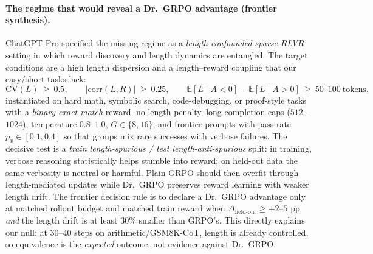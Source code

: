 \paragraph{The regime that would reveal a Dr.~GRPO advantage (frontier synthesis).}
ChatGPT Pro specified the missing regime as a \emph{length-confounded sparse-RLVR}
setting in which reward discovery and length dynamics are entangled. The target
conditions are a high length dispersion and a length--reward coupling that our
easy/short tasks lack:
\begin{equation}
\mathrm{CV}(L)\ \ge\ 0.5, \qquad
\bigl|\mathrm{corr}(L,R)\bigr|\ \ge\ 0.25, \qquad
\mathbb{E}[L \mid A<0] - \mathbb{E}[L \mid A>0]\ \ge\ 50\text{--}100\ \text{tokens},
\end{equation}
instantiated on hard math, symbolic search, code-debugging, or proof-style tasks
with a \emph{binary exact-match} reward, no length penalty, long completion caps
($512$--$1024$), temperature $0.8$--$1.0$, $G\in\{8,16\}$, and frontier prompts
with pass rate $p_x\in[0.1,0.4]$ so that groups mix rare successes with verbose
failures. The decisive test is a \emph{train length-spurious / test
length-anti-spurious} split: in training, verbose reasoning statistically helps
stumble into reward; on held-out data the same verbosity is neutral or harmful.
Plain GRPO should then overfit through length-mediated updates while Dr.~GRPO
preserves reward learning with weaker length drift. The frontier decision rule
is to declare a Dr.~GRPO advantage only at matched rollout budget and matched
train reward when $\Delta_{\text{held-out}}\ge +2$--$5$ pp \emph{and} the length
drift is at least $30\%$ smaller than GRPO's. This directly explains our null:
at $30$--$40$ steps on arithmetic/GSM8K-CoT, length is already controlled, so
equivalence is the \emph{expected} outcome, not evidence against Dr.~GRPO.

